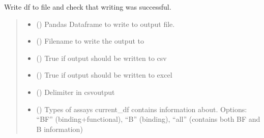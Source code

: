 \documentclass[letterpaper,10pt,english]{sphinxmanual}
\begin{document}
\begin{fulllineitems}
\label{\detokenize{write_subsets:write_subsets.write_and_check_output}}
\pysigstartsignatures
{}
\pysigstopsignatures
\sphinxAtStartPar
Write df to file and check that writing was successful.
\begin{quote}\begin{description}
\begin{itemize}
\item {} 
\sphinxAtStartPar
{} () \textendash{} Pandas Dataframe to write to output file.

\item {} 
\sphinxAtStartPar
{} () \textendash{} Filename to write the output to

\item {} 
\sphinxAtStartPar
{} () \textendash{} True if output should be written to csv

\item {} 
\sphinxAtStartPar
{} () \textendash{} True if output should be written to excel

\item {} 
\sphinxAtStartPar
{} () \textendash{} Delimiter in csv\sphinxhyphen{}output

\item {} 
\sphinxAtStartPar
{} () \textendash{} Types of assays current\_df contains information about.         Options: “BF” (binding+functional),
“B” (binding),
“all” (contains both BF and B information)


\end{itemize}
\end{description}
\end{quote}
\end{fulllineitems}
\end{document}
